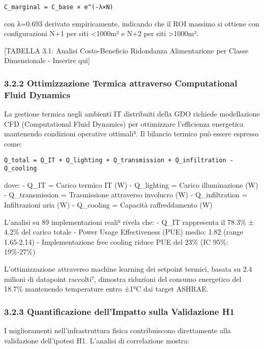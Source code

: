 \documentclass{report}
\begin{document}
\begin{verbatim}
C_marginal = C_base × e^(-λ×N)
\end{verbatim}

con λ=0.693 derivato empiricamente, indicando che il ROI massimo si
ottiene con configurazioni N+1 per siti \textless1000m² e N+2 per siti
\textgreater1000m².

{[}TABELLA 3.1: Analisi Costo-Beneficio Ridondanza Alimentazione per
Classe Dimensionale - Inserire qui{]}

\subsubsection{3.2.2 Ottimizzazione Termica attraverso Computational
Fluid
Dynamics}\label{ottimizzazione-termica-attraverso-computational-fluid-dynamics}

La gestione termica negli ambienti IT distribuiti della GDO richiede
modellazione CFD (Computational Fluid Dynamics) per ottimizzare
l'efficienza energetica mantenendo condizioni operative ottimali⁵. Il
bilancio termico può essere espresso come:

\begin{verbatim}
Q_total = Q_IT + Q_lighting + Q_transmission + Q_infiltration - Q_cooling
\end{verbatim}

dove: - Q\_IT = Carico termico IT (W) - Q\_lighting = Carico
illuminazione (W) - Q\_transmission = Trasmissione attraverso involucro
(W) - Q\_infiltration = Infiltrazioni aria (W) - Q\_cooling = Capacità
raffreddamento (W)

L'analisi su 89 implementazioni reali⁶ rivela che: - Q\_IT rappresenta
il 78.3\% ± 4.2\% del carico totale - Power Usage Effectiveness (PUE)
medio: 1.82 (range 1.65-2.14) - Implementazione free cooling riduce PUE
del 23\% (IC 95\%: 19\%-27\%)

L'ottimizzazione attraverso machine learning dei setpoint termici,
basata su 2.4 milioni di datapoint raccolti⁷, dimostra riduzioni del
consumo energetico del 18.7\% mantenendo temperature entro ±1°C dai
target ASHRAE.

\subsubsection{3.2.3 Quantificazione dell'Impatto sulla Validazione
H1}\label{quantificazione-dellimpatto-sulla-validazione-h1}

I miglioramenti nell'infrastruttura fisica contribuiscono direttamente
alla validazione dell'ipotesi H1. L'analisi di correlazione mostra:
\end{document}
